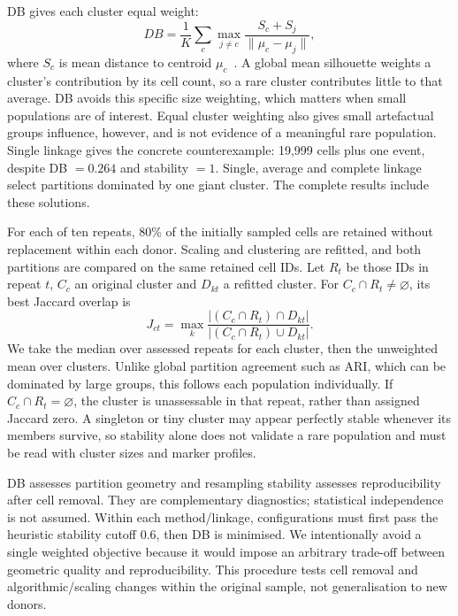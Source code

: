 \documentclass[11pt,a4paper]{article}
\begin{document}
DB gives each cluster equal weight:
\[
DB=\frac1K\sum_c\max_{j\ne c}\frac{S_c+S_j}{\|\mu_c-\mu_j\|},
\]
where $S_c$ is mean distance to centroid $\mu_c$~\cite{db}. A global mean silhouette weights a cluster's contribution by its cell count, so a rare cluster contributes little to that average. DB avoids this specific size weighting, which matters when small populations are of interest. Equal cluster weighting also gives small artefactual groups influence, however, and is not evidence of a meaningful rare population. Single linkage gives the concrete counterexample: 19,999 cells plus one event, despite DB $=0.264$ and stability $=1$. Single, average and complete linkage select partitions dominated by one giant cluster. The complete results include these solutions.

For each of ten repeats, 80\% of the initially sampled cells are retained without replacement within each donor. Scaling and clustering are refitted, and both partitions are compared on the same retained cell IDs. Let $R_t$ be those IDs in repeat $t$, $C_c$ an original cluster and $D_{kt}$ a refitted cluster. For $C_c\cap R_t\ne\varnothing$, its best Jaccard overlap is
\[
J_{ct}=\max_k\frac{|(C_c\cap R_t)\cap D_{kt}|}{|(C_c\cap R_t)\cup D_{kt}|}.
\]
We take the median over assessed repeats for each cluster, then the unweighted mean over clusters. Unlike global partition agreement such as ARI, which can be dominated by large groups, this follows each population individually. If $C_c\cap R_t=\varnothing$, the cluster is unassessable in that repeat, rather than assigned Jaccard zero. A singleton or tiny cluster may appear perfectly stable whenever its members survive, so stability alone does not validate a rare population and must be read with cluster sizes and marker profiles.

DB assesses partition geometry and resampling stability assesses reproducibility after cell removal. They are complementary diagnostics; statistical independence is not assumed. Within each method/linkage, configurations must first pass the heuristic stability cutoff 0.6, then DB is minimised. We intentionally avoid a single weighted objective because it would impose an arbitrary trade-off between geometric quality and reproducibility. This procedure tests cell removal and algorithmic/scaling changes within the original sample, not generalisation to new donors.

\begin{table}[htb]\centering\footnotesize

\caption{Selected configurations for every method/linkage, including the degenerate hierarchical solutions. A high largest-cluster fraction reveals information not captured by the score alone.}
\end{table}
{\footnotesize}
\end{document}
